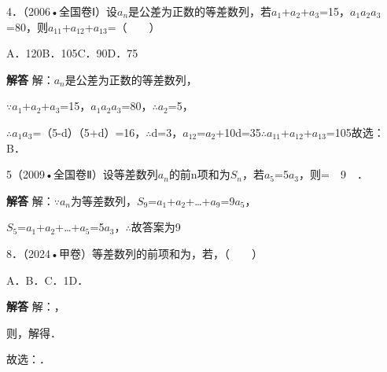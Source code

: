4．（2006•全国卷Ⅰ）设{\ensuremath{a_{n}}}是公差为正数的等差数列，若\ensuremath{a_{1}}+\ensuremath{a_{2}}+\ensuremath{a_{3}}=15，\ensuremath{a_{1}}\ensuremath{a_{2}}\ensuremath{a_{3}}=80，则\ensuremath{a_{11}}+\ensuremath{a_{12}}+\ensuremath{a_{13}}=（　　）\par
\qquad{}\qquad{}\qquad{}A．120\qquad{}B．105\qquad{}C．90\qquad{}D．75\qquad{}\par
\QuestionSpace{1.2cm}
\ifshowanswers
\par\begingroup\color{solutioncolor}\noindent\textbf{解答}\quad
解：{\ensuremath{a_{n}}}是公差为正数的等差数列，\par
\ensuremath{\because}\ensuremath{a_{1}}+\ensuremath{a_{2}}+\ensuremath{a_{3}}=15，\ensuremath{a_{1}}\ensuremath{a_{2}}\ensuremath{a_{3}}=80，\ensuremath{\therefore}\ensuremath{a_{2}}=5，\par
\ensuremath{\therefore}\ensuremath{a_{1}}\ensuremath{a_{3}}=（5-d）（5+d）=16，\ensuremath{\therefore}d=3，\ensuremath{a_{12}}=\ensuremath{a_{2}}+10d=35\ensuremath{\therefore}\ensuremath{a_{11}}+\ensuremath{a_{12}}+\ensuremath{a_{13}}=105故选：B．\par
\par\endgroup\fi

5（2009•全国卷Ⅱ）设等差数列{\ensuremath{a_{n}}}的前n项和为\ensuremath{S_{n}}，若\ensuremath{a_{5}}=5\ensuremath{a_{3}}，则=　9　．\par
\ifshowanswers
\par\begingroup\color{solutioncolor}\noindent\textbf{解答}\quad
解：\ensuremath{\because}{\ensuremath{a_{n}}}为等差数列，\ensuremath{S_{9}}=\ensuremath{a_{1}}+\ensuremath{a_{2}}+\ldots{}+\ensuremath{a_{9}}=9\ensuremath{a_{5}}，\par
\ensuremath{S_{5}}=\ensuremath{a_{1}}+\ensuremath{a_{2}}+\ldots{}+\ensuremath{a_{5}}=5\ensuremath{a_{3}}，\ensuremath{\therefore}故答案为9\par
\par\endgroup\fi

8．（2024•甲卷）等差数列的前项和为，若，（　　）\par
\qquad{}\qquad{}\qquad{}A．\qquad{}B．\qquad{}C．1\qquad{}D．\par
\QuestionSpace{1.2cm}
\ifshowanswers
\par\begingroup\color{solutioncolor}\noindent\textbf{解答}\quad
解：，\par
则，解得．\par
故选：．\par
\par\endgroup\fi

